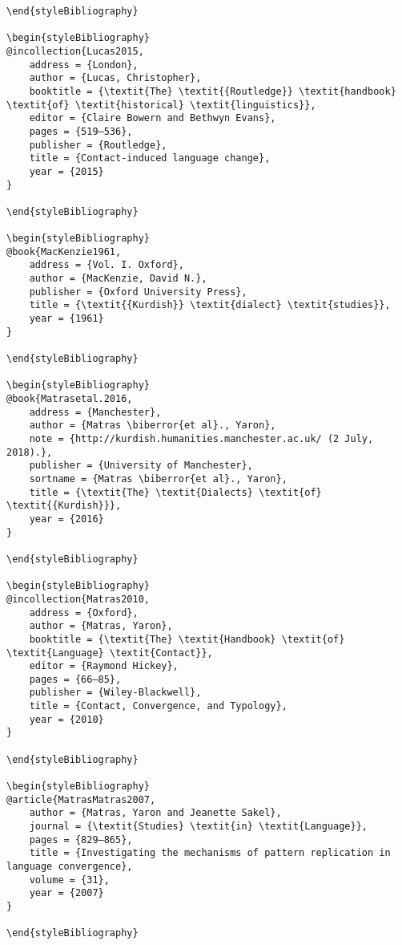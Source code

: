 \documentclass[output=paper]{langsci/langscibook}
\begin{document}
\begin{verbatim}
\end{styleBibliography}

\begin{styleBibliography}
@incollection{Lucas2015,
	address = {London},
	author = {Lucas, Christopher},
	booktitle = {\textit{The} \textit{{Routledge}} \textit{handbook} \textit{of} \textit{historical} \textit{linguistics}},
	editor = {Claire Bowern and Bethwyn Evans},
	pages = {519–536},
	publisher = {Routledge},
	title = {Contact-induced language change},
	year = {2015}
}

\end{styleBibliography}

\begin{styleBibliography}
@book{MacKenzie1961,
	address = {Vol. I. Oxford},
	author = {MacKenzie, David N.},
	publisher = {Oxford University Press},
	title = {\textit{{Kurdish}} \textit{dialect} \textit{studies}},
	year = {1961}
}

\end{styleBibliography}

\begin{styleBibliography}
@book{Matrasetal.2016,
	address = {Manchester},
	author = {Matras \biberror{et al}., Yaron},
	note = {http://kurdish.humanities.manchester.ac.uk/ (2 July, 2018).},
	publisher = {University of Manchester},
	sortname = {Matras \biberror{et al}., Yaron},
	title = {\textit{The} \textit{Dialects} \textit{of} \textit{{Kurdish}}},
	year = {2016}
}

\end{styleBibliography}

\begin{styleBibliography}
@incollection{Matras2010,
	address = {Oxford},
	author = {Matras, Yaron},
	booktitle = {\textit{The} \textit{Handbook} \textit{of} \textit{Language} \textit{Contact}},
	editor = {Raymond Hickey},
	pages = {66–85},
	publisher = {Wiley-Blackwell},
	title = {Contact, Convergence, and Typology},
	year = {2010}
}

\end{styleBibliography}

\begin{styleBibliography}
@article{MatrasMatras2007,
	author = {Matras, Yaron and Jeanette Sakel},
	journal = {\textit{Studies} \textit{in} \textit{Language}},
	pages = {829–865},
	title = {Investigating the mechanisms of pattern replication in language convergence},
	volume = {31},
	year = {2007}
}

\end{styleBibliography}


\end{verbatim}
\end{document}
